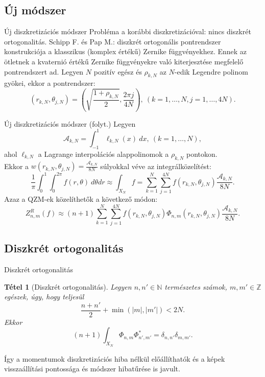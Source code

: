 \documentclass{beamer}
\newcommand{\N}{\mathbb{N}}
\newcommand{\Z}{\mathbb{Z}}
\def\N{{\mathbb N}}
\def\Z{{\mathbb Z}}
\newtheorem{tetel}{Tétel}
\begin{document}
\subsection{Új módszer}
\begin{frame}{Új diszkretizációs módszer}
    \vskip 10mm
    Probléma a korábbi diszkretizációval: nincs diszkrét ortogonalitás.
    \vskip 5mm
    Schipp F. és Pap M.: diszkrét ortogonális pontrendszer konstrukciója a klasszikus (komplex értékű) Zernike függvényekhez.
    \vskip 3mm
    Ennek az ötletnek a kvaternió értékű Zernike függvényekre való kiterjesztése megfelelő pontrendszert ad.
    \vskip 3mm
    Legyen $N$ pozitív egész és $\rho_{k,N}$ az $N$-edik Legendre polinom gyökei, ekkor a pontrendszer:
    $$(r_{k,N}, \theta_{j,N}) = \left(\sqrt{\frac{1+\rho_{k,N}}{2}} , \frac{2\pi j}{4N} \right), \ (k=1,\ldots,N,j=1,\ldots,4N).$$
    
\end{frame}

\begin{frame}{Új diszkretizációs módszer (folyt.)}
    \vskip 8mm
    Legyen $$\mathcal{A}_{k,N} = \int_{-1}^{1} \ell_{k,N}(x)\ dx, \ (k=1,\ldots,N),$$ ahol $\ell_{k,N}$ a Lagrange interpolációs alappolinomok a $\rho_{k,N}$ pontokon.\\
    Ekkor a $w(r_{k,N},\theta_{j,N}) = \frac{\mathcal{A}_{k,N}}{8N}$ súlyokkal véve az integrálközelítést:
    $$\frac{1}{\pi} \int_{0}^1 \int_0^{2\pi} f(r,\theta)\ d\theta dr \approx \int_{X_N} f = \sum_{k=1}^{N} \sum_{j=1}^{4N} f(r_{k,N},\theta_{j,N}) \frac{\mathcal{A}_{k,N}}{8N}.$$
    Azaz a QZM-ek közelíthetők a következő módon:
    $$Z^R_{n,m}(f) \approx (n+1)\sum_{k=1}^{N}\sum_{j=1}^{4N}f(r_{k,N},\theta_{j,N})\Phi_{n,m}(r_{k,N},\theta_{j,N})\frac{\mathcal{A}_{k,N}}{8N}.$$

\end{frame}


\subsection{Diszkrét ortogonalitás}
\begin{frame}{Diszkrét ortogonalitás}
\begin{tetel}[Diszkrét ortogonalitás]
    Legyen $n, n' \in \N$ természetes számok, $m, m' \in \Z$ egészek, úgy, hogy teljesül $$\frac{n + n'}{2} + \min(|m|,|m'|) < 2N.$$
    Ekkor $$(n + 1)\int_{X_N}\Phi_{n,m}\Phi_{n',m'}^* = \delta_{n,n'}\delta_{m,m'}.$$
\end{tetel}
Így a momentumok diszkretizációs hiba nélkül előállíthatók és a képek visszaállítási pontossága és módszer hibatűrése is javult.
\end{frame}
\end{document}
